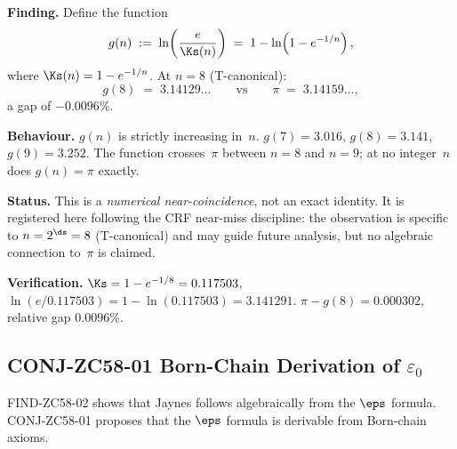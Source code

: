\documentclass[12pt, a4paper]{article}
\begin{document}
\begin{derivedbox}[title={FIND-ZC58-04:
  $\ln(e/\Ks)=1{-}\ln(1{-}e^{-1/n})\approx\pi$
  at $n=8$ (Near-Coincidence, $R_0$)}]
\textbf{Finding.}
Define the function
\begin{equation}
  g(n) \;:=\; \ln\!\left(\frac{e}{\Ks(n)}\right)
  \;=\; 1 - \ln\!\left(1-e^{-1/n}\right),
  \label{eq:g-func}
\end{equation}
where $\Ks(n)=1-e^{-1/n}$.
At $n=8$ (T-canonical):
\begin{equation}
  g(8) \;=\; 3.14129\ldots
  \qquad\text{vs}\qquad
  \pi \;=\; 3.14159\ldots,
  \label{eq:near-pi}
\end{equation}
a gap of $-0.0096\%$.

\textbf{Behaviour.}
$g(n)$ is strictly increasing in~$n$.
$g(7)=3.016$, $g(8)=3.141$, $g(9)=3.252$.
The function crosses~$\pi$ between $n=8$ and $n=9$;
at no integer~$n$ does $g(n)=\pi$ exactly.

\textbf{Status.}
This is a \emph{numerical near-coincidence}, not an exact
identity.  It is registered here following the CRF
near-miss discipline: the observation is specific to
$n=2^{\ds}=8$ (T-canonical) and may guide future analysis,
but no algebraic connection to~$\pi$ is claimed.

\textbf{Verification.}
$\Ks=1-e^{-1/8}=0.117503$,
$\ln(e/0.117503)=1-\ln(0.117503)=3.141291$.
$\pi-g(8)=0.000302$, relative gap $0.0096\%$.
\end{derivedbox}

\subsection{CONJ-ZC58-01 \quad Born-Chain Derivation of $\varepsilon_0$}
\label{sec:conj01}

FIND-ZC58-02 shows that Jaynes follows algebraically from
the $\eps$ formula.  CONJ-ZC58-01 proposes that the $\eps$
formula is derivable from Born-chain axioms.

\end{document}
